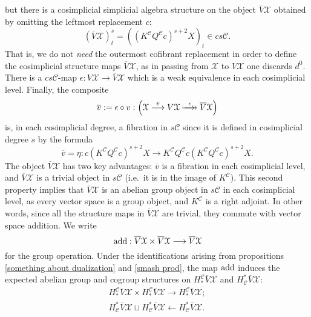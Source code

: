 \documentclass[11pt]{amsart} \renewcommand{\baselinestretch}{1.2}
\theoremstyle{plain}
\numberwithin{equation}{section} %
\theoremstyle{plain}
\numberwithin{equation}{chapter} %
\renewcommand{\to}{\longrightarrow}
\newcommand{\from}{\longleftarrow}
\newcommand{\calx}{\mathcal{X}}
\newcommand{\calc}{\mathcal{C}}
\newcommand{\epi}{{\,\makebox[0cm][l]{\ensuremath\to}\to{}}}
\begin{document}
\begin{Operations on the Bousfield-Kan spectral sequence}
but there is a cosimplicial simplicial algebra structure on the object $\overline{V}\calx$ obtained by omitting the leftmost replacement $c$:
\[(\overline{V}\calx)^s_t=((K^{\calc}Q^{\calc}c)^{s+2}X)_t\in cs\calc.\]
That is, we do not \emph{need} the outermost cofibrant replacement in order to define the cosimplicial structure maps $\overline{V}\calx$, as in passing from $\calx$ to $V\calx$ one discards $d^0$. There is a $cs\calc$-map $\epsilon:V\calx \to \overline{V}\calx $ which is a weak equivalence in each cosimplicial level. Finally, the composite
\[\overline{v}:=\epsilon\circ v:\left(\calx\overset{v}{\to}V\calx\overset{\epsilon}{\epi} \overline{V}\calx\right)\]
is, in each cosimplicial degree, a fibration in $s\calc$ since it is defined in cosimplicial degree $s$ by the formula \[\overline{v}=\eta:c(K^{\calc}Q^{\calc}c)^{s+2}X\to K^{\calc}Q^{\calc}c(K^{\calc}Q^{\calc}c)^{s+2}X.\]
 The object $\overline{V}\calx$ has two key advantages: $\overline{v}$ is a fibration in each cosimplicial level, and $\overline{V}\calx$ is a trivial object in $s\calc$ (i.e.\ it is in the image of $K^{\calc}$). This second property implies that  $\overline{V}\calx$ is an abelian group object in $s\calc$ in each cosimplicial level, as every vector space is a group object, and $K^{\calc}$ is a right adjoint. In other words, since all the structure maps in $\overline{V}\calx$ are trivial, they commute  with vector space addition. We write
\[\textup{add}:\overline{V}\calx\times \overline{V}\calx\to \overline{V}\calx\]
for the group operation. Under the identifications arising from propositions \ref{something about dualization} and \ref{smash prod}, the map $\textup{add}$ induces the expected abelian group and cogroup structures on $H_*^\calc\overline{V}\calx$ and $H^*_\calc\overline{V}\calx$:
\begin{gather*}
H_*^\calc\overline{V}\calx\times H_*^\calc\overline{V}\calx\to H_*^\calc\overline{V}\calx;\\
H^*_\calc\overline{V}\calx\sqcup H^*_\calc\overline{V}\calx\from H^*_\calc\overline{V}\calx.
\end{gather*}


\end{Operations on the Bousfield-Kan spectral sequence}
\end{document}
